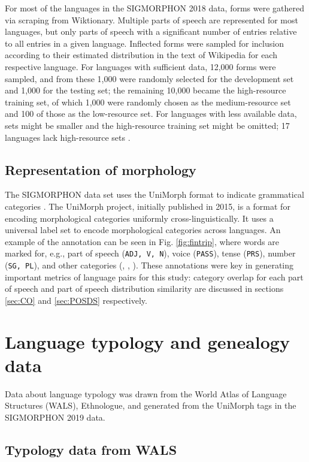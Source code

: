 For most of the languages in the SIGMORPHON 2018 data, forms were gathered via scraping from Wiktionary. Multiple parts of speech are represented for most languages, but only parts of speech with a significant number of entries relative to all entries in a given language. Inflected forms were sampled for inclusion according to their estimated distribution in the text of Wikipedia for each respective language. For languages with sufficient data, 12,000 forms were sampled, and from these 1,000 were randomly selected for the development set and 1,000 for the testing set; the remaining 10,000 became the high-resource training set, of which 1,000 were randomly chosen as the medium-resource set and 100 of those as the low-resource set. For languages with less available data, sets might be smaller and the high-resource training set might be omitted; 17 languages lack high-resource sets \parencite{Cotterell2018b}.

\subsection{Representation of morphology}

The SIGMORPHON data set uses the UniMorph format to indicate grammatical categories  \parencite{Cotterell2018b}. The UniMorph project, initially published in 2015, is a format for encoding morphological categories uniformly cross-linguistically. It uses a universal label set to encode morphological categories across languages. An example of the annotation can be seen in Fig. \ref{fig:fintrip}, where words are marked for, e.g., part of speech (\texttt{ADJ, V, N}), voice (\texttt{PASS}), tense (\texttt{PRS}), number (\texttt{SG, PL}), and other categories (\cite{SylakGlassman2015}, \cite{SylakGlassman2015a}, \cite{SylakGlassman2016}). These annotations were key in generating important metrics of language pairs for this study: category overlap for each part of speech and part of speech distribution similarity are discussed in sections \ref{sec:CO} and \ref{sec:POSDS} respectively.

\section{Language typology and genealogy data}

Data about language typology was drawn from the World Atlas of Language Structures (WALS), Ethnologue, and generated from the UniMorph tags in the SIGMORPHON 2019 data.

\subsection{Typology data from WALS}

